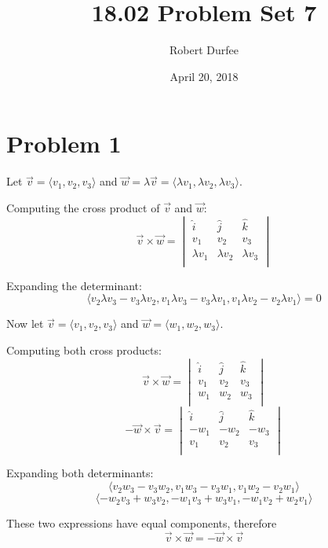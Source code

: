 \documentclass{article}
\title{ 18.02 Problem Set 7 }
\author{ Robert Durfee }
\date{ April 20, 2018 }
\begin{document}
\maketitle

\section*{Problem 1}

Let $\vec{v} = \langle v_1, v_2, v_3 \rangle$ and $\vec{w} = \lambda \vec{v} =
\langle \lambda v_1, \lambda v_2, \lambda v_3 \rangle$.

\bigbreak

Computing the cross product of $\vec{v}$ and $\vec{w}$:
$$ \vec{v} \times \vec{w} = 
\begin{vmatrix}
  \hat{i} & \hat{j} & \hat{k} \\
  v_1 & v_2 & v_3 \\
  \lambda v_1 & \lambda v_2 & \lambda v_3 \\
\end{vmatrix} $$

Expanding the determinant:
$$\langle v_2 \lambda v_3 - v_3 \lambda v_2, v_1 \lambda v_3 - v_3 \lambda v_1,
v_1 \lambda v_2 - v_2 \lambda v_1 \rangle = 0 $$

Now let $\vec{v} = \langle v_1, v_2, v_3 \rangle$ and $\vec{w} = \langle w_1,
w_2, w_3 \rangle$. 

\bigbreak

Computing both cross products:
$$ \vec{v} \times \vec{w} = 
\begin{vmatrix}
   \hat{i} & \hat{j} & \hat{k} \\
   v_1 & v_2 & v_3 \\
   w_1 & w_2 & w_3 \\
\end{vmatrix} $$
$$ -\vec{w} \times \vec{v} =
\begin{vmatrix}
   \hat{i} & \hat{j} & \hat{k} \\
   -w_1 & -w_2 & -w_3 \\
   v_1 & v_2 & v_3 \\
\end{vmatrix}$$ 

Expanding both determinants:
$$ \langle v_2 w_3 - v_3 w_2, v_1 w_3 - v_3 w_1, v_1 w_2 - v_2 w_1 \rangle$$
$$ \langle -w_2 v_3 + w_3 v_2, -w_1 v_3 + w_3 v_1, -w_1 v_2 + w_2 v_1 \rangle $$

These two expressions have equal components, therefore
$$ \vec{v} \times \vec{w} = -\vec{w} \times \vec{v} $$
\end{document}
